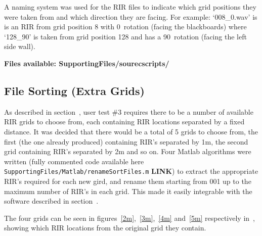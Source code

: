 \documentclass[../../main.tex]{subfiles}
\begin{document}
			A naming system was used for the \ac{RIR} files to indicate which grid positions they were taken from and which direction they are facing. For example: `008\_0.wav' is is an \ac{RIR} from grid position 8 with 0\textdegree~rotation (facing the blackboards) where `128\_90' is taken from grid position 128 and has a 90\textdegree~rotation (facing the left side wall).

			\textbf{Files available: SupportingFiles/sourecscripts/}

	\subsection{File Sorting (Extra Grids)}

		As described in section~, user test \#3 requires there to be a number of available \ac{RIR} grids to choose from, each containing \ac{RIR} locations separated by a fixed distance. It was decided that there would be a total of 5 grids to choose from, the first (the one already produced) containing \ac{RIR}'s separated by 1m, the second grid containing \ac{RIR}'s separated by 2m and so on.	 Four Matlab algorithms were written (fully commented code available here \texttt{SupportingFiles/Matlab/renameSortFiles.m} \textbf{LINK}) to extract the appropriate \ac{RIR}'s required for each new gird, and rename them starting from 001 up to the maximum number of \ac{RIR}'s in each grid. This made it easily  integrable with the software described in section~.

		The four grids can be seen in figures~\ref{2m},~\ref{3m},~\ref{4m} and~\ref{5m} respectively in~, showing which \ac{RIR} locations from the original grid they contain.

	
\end{document}
